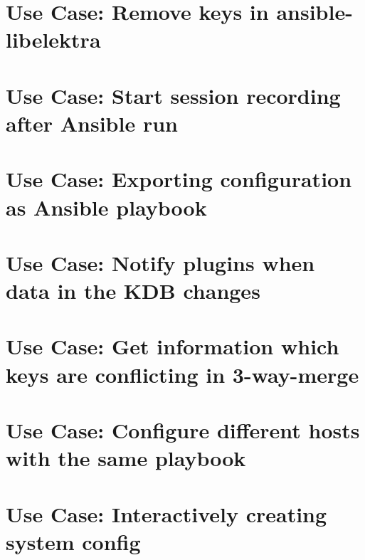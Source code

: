 \let\mypdfximage\pdfximage\def\pdfximage{\immediate\mypdfximage}\documentclass[twoside]{book}
\newcommand{\+}{\discretionary{\mbox{\scriptsize$\hookleftarrow$}}{}{}}
\begin{document}
\chapter{Use Case\+: Remove keys in ansible-\/libelektra}
\label{doc_usecases_record_elektra_UC_ansible-libelektra_remove_keys_md}

\chapter{Use Case\+: Start session recording after Ansible run}
\label{doc_usecases_record_elektra_UC_ansible-libelektra_start_recording_md}

\chapter{Use Case\+: Exporting configuration as Ansible playbook}
\label{doc_usecases_record_elektra_UC_ansible_export_md}

\chapter{Use Case\+: Notify plugins when data in the KDB changes}
\label{doc_usecases_record_elektra_UC_change_notifications_md}

\chapter{Use Case\+: Get information which keys are conflicting in 3-\/way-\/merge}
\label{doc_usecases_record_elektra_UC_cmerge_conflict_keys_md}

\chapter{Use Case\+: Configure different hosts with the same playbook}
\label{doc_usecases_record_elektra_UC_different_hosts_md}

\chapter{Use Case\+: Interactively creating system config}
\label{doc_usecases_record_elektra_UC_interactive_configuration_md}

\end{document}
